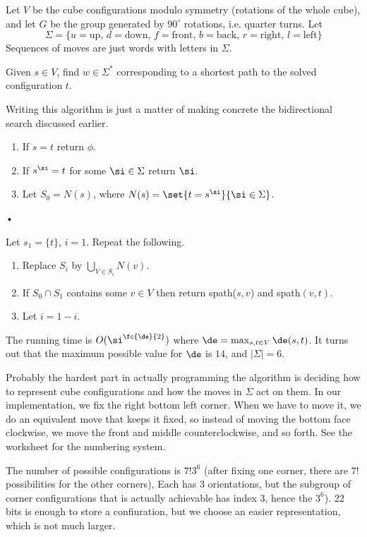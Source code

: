 Let $V$ be the cube configurations modulo symmetry (rotations of the whole cube), and let $G$ be the group generated by $90^{\circ}$ rotations, i.e. quarter turns. Let
\[
\Sigma=\{
u=\text{up},\,d=\text{down},\,f=\text{front},\,b=\text{back},\,
r=\text{right},\,l=\text{left}
\}
\]
Sequences of moves are just words with letters in $\Sigma$.
\begin{prb}
Given $s\in V$, find $w\in \Sigma^*$ corresponding to a shortest path to the solved configuration $t$.
\end{prb}
Writing this algorithm is just a matter of making concrete the bidirectional search discussed earlier.
\begin{alg}
\begin{enumerate}
\item If $s=t$ return $\phi$.
\item If $s^{\si}=t$ for some $\si\in \Sigma$ return $\si$.
\item Let $S_0=N(s)$, where $N(s)=\set{t=s^{\si}}{\si\in \Sigma}$.
\end{enumerate}•
\item Let $s_1=\{t\}$, $i=1$.
Repeat the following.
\begin{enumerate}
\item Replace $S_i$ by $\bigcup_{V\in S_i} N(v)$.
\item If $S_0\cap S_1$ contains some $v\in V$ then return spath($s,v$) and spath$(v,t)$.
\item 
Let $i=1-i$.
\end{enumerate}
\end{alg}
The running time is $O(\si^{\fc{\de}{2}})$ where $\de=\max_{s,t\in V}\de(s,t)$. It turns out that the maximum possible value for $\de$ is $14$, and $|\Sigma|=6$.

Probably the hardest part in actually programming the algorithm is deciding how to represent cube configurations and how the moves in $\Sigma$ act on them. In our implementation, we fix  the right bottom left corner. When we have to move it, we do an equivalent move that keeps it fixed, so instead of moving the bottom face clockwise, we move the front and middle counterclockwise, and so forth. See the worksheet for the numbering system.

The number of possible configurations is $7! 3^6$ (after fixing one corner, there are $7!$ possibilities for the other corners), Each has 3 orientations, but the subgroup of corner configurations that is actually achievable has index 3, hence the $3^6$). 22 bits is enough to store a confiuration, but we choose an easier representation, which is not much larger.

